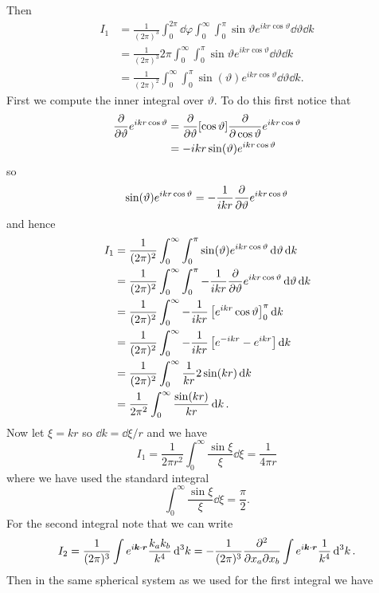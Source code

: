 \documentclass[a4paper]{article}
\begin{document}
    Then
    \begin{align*}
        I_1 &= \frac{1}{(2\pi)^3} \int_{0}^{2\pi} \dd{\varphi} \int_0^{\infty}\int_0^{\pi} \sin\vartheta e^{ikr\cos\vartheta} \dd{\vartheta}\dd{k}\\
        &= \frac{1}{(2\pi)^3} 2\pi \int_0^{\infty}\int_0^{\pi} \sin\vartheta e^{ikr\cos\vartheta} \dd{\vartheta}\dd{k}\\
        &= \frac{1}{(2\pi)^2} \int_0^{\infty}\int_0^{\pi} \sin(\vartheta) e^{ikr\cos\vartheta} \dd{\vartheta}\dd{k}.
    \end{align*}
    First we compute the inner integral over \(\vartheta\).
    To do this first notice that
    \begin{align*}
        \pdv{\vartheta} e^{ikr\cos\vartheta} &= \pdv{\vartheta}[\cos\vartheta]\pdv{\cos\vartheta}e^{ikr\cos\vartheta}\\
        &= -ikr\sin(\vartheta) e^{ikr\cos\vartheta}
    \end{align*}
    so
    \[\sin(\vartheta) e^{ikr\cos\vartheta} = -\frac{1}{ikr}\pdv{\vartheta}e^{ikr\cos\vartheta}\]
    and hence
    \begin{align*}
        I_1 &= \frac{1}{(2\pi)^2} \int_0^{\infty}\int_0^{\pi} \sin(\vartheta) e^{ikr\cos\vartheta} \dd{\vartheta}\dd{k}\\
        &= \frac{1}{(2\pi)^2} \int_0^{\infty} \int_{0}^{\pi} -\frac{1}{ikr}\pdv{\vartheta} e^{ikr\cos\vartheta} \dd{\vartheta}\dd{k}\\
        &= \frac{1}{(2\pi)^2} \int_0^{\infty} -\frac{1}{ikr}\left[ e^{ikr}\cos\vartheta \right]_{0}^{\pi} \dd{k}\\
        &= \frac{1}{(2\pi)^2} \int_0^{\infty} -\frac{1}{ikr}\left[ e^{-ikr} - e^{ikr} \right] \dd{k}\\
        &= \frac{1}{(2\pi)^2} \int_0^{\infty} \frac{1}{kr}2\sin(kr)\dd{k}\\
        &= \frac{1}{2\pi^2} \int_0^{\infty} \frac{\sin(kr)}{kr}\dd{k}.
    \end{align*}
    Now let \(\xi = kr\) so \(\dd{k} = \dd{\xi}/r\) and we have
    \[I_1 = \frac{1}{2\pi r^2}\int_0^{\infty} \frac{\sin\xi}{\xi} \dd{\xi} = \frac{1}{4\pi r}\]
    where we have used the standard integral
    \[\int_0^{\infty} \frac{\sin \xi}{\xi} \dd{\xi} = \frac{\pi}{2}.\]
    For the second integral note that we can write
    \[I_2 = \frac{1}{(2\pi)^3} \int e^{i\bm{k} \cdot \bm{r}} \frac{k_ak_b}{k^4} \dd[3]{k} = -\frac{1}{(2\pi)^3} \frac{\partial^2{}}{\partial{x_a}\partial{x_b}} \int e^{i\bm{k}\cdot\bm{r}}\frac{1}{k^4} \dd[3]{k}.\]
    Then in the same spherical system as we used for the first integral we have
\end{document}
